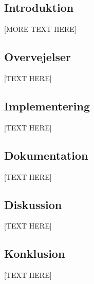 \documentclass[../main.tex]{subfiles}
\begin{document}
\subsection{Introduktion}
[MORE TEXT HERE]

\subsection{Overvejelser}
[TEXT HERE]

\subsection{Implementering}
[TEXT HERE]

\subsection{Dokumentation}
[TEXT HERE]

\subsection{Diskussion}
[TEXT HERE]

\subsection{Konklusion}
[TEXT HERE]
\end{document}
